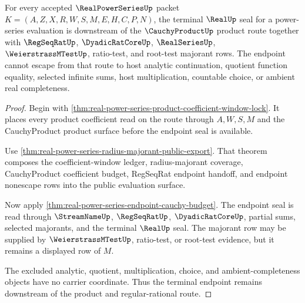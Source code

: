 \begin{theorem}
\label{thm:real-power-series-product-endpoint-nonescape}
For every accepted $\RealPowerSeriesUp$ packet $K=(A,Z,X,R,W,S,M,E,H,C,P,N)$, the terminal $\RealUp$ seal for a power-series evaluation is downstream of the $\CauchyProductUp$ product route together with $\RegSeqRatUp$, $\DyadicRatCoreUp$, $\RealSeriesUp$, $\WeierstrassMTestUp$, ratio-test, and root-test majorant rows. The endpoint cannot escape from that route to host analytic continuation, quotient function equality, selected infinite sums, host multiplication, countable choice, or ambient real completeness.
\end{theorem}
\begin{proof}
Begin with \autoref{thm:real-power-series-product-coefficient-window-lock}. It places every product coefficient read on the route through $A,W,S,M$ and the CauchyProduct product surface before the endpoint seal is available.

Use \autoref{thm:real-power-series-radius-majorant-public-export}. That theorem composes the coefficient-window ledger, radius-majorant coverage, CauchyProduct coefficient budget, RegSeqRat endpoint handoff, and endpoint nonescape rows into the public evaluation surface.

Now apply \autoref{thm:real-power-series-endpoint-cauchy-budget}. The endpoint seal is read through $\StreamNameUp$, $\RegSeqRatUp$, $\DyadicRatCoreUp$, partial sums, selected majorants, and the terminal $\RealUp$ seal. The majorant row may be supplied by $\WeierstrassMTestUp$, ratio-test, or root-test evidence, but it remains a displayed row of $M$.

The excluded analytic, quotient, multiplication, choice, and ambient-completeness objects have no carrier coordinate. Thus the terminal endpoint remains downstream of the product and regular-rational route.
\end{proof}

